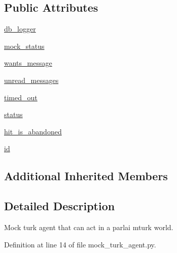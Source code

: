 \subsection*{Public Attributes}
\begin{DoxyCompactItemize}
\item 
\hyperlink{classparlai_1_1mturk_1_1webapp_1_1run__mocks_1_1mock__turk__agent_1_1MockTurkAgent_af5b22167ce7c695856bd9dac6c0fdd4f}{db\+\_\+logger}
\item 
\hyperlink{classparlai_1_1mturk_1_1webapp_1_1run__mocks_1_1mock__turk__agent_1_1MockTurkAgent_a7611391e84274d3980db9d567db13ae9}{mock\+\_\+status}
\item 
\hyperlink{classparlai_1_1mturk_1_1webapp_1_1run__mocks_1_1mock__turk__agent_1_1MockTurkAgent_a9aefbba229f0b0df3d267cad88df15e5}{wants\+\_\+message}
\item 
\hyperlink{classparlai_1_1mturk_1_1webapp_1_1run__mocks_1_1mock__turk__agent_1_1MockTurkAgent_afd7b0a0daee5029fa5ceb102d2f809f2}{unread\+\_\+messages}
\item 
\hyperlink{classparlai_1_1mturk_1_1webapp_1_1run__mocks_1_1mock__turk__agent_1_1MockTurkAgent_a428a987df6d32cfbdc591bec133b66ee}{timed\+\_\+out}
\item 
\hyperlink{classparlai_1_1mturk_1_1webapp_1_1run__mocks_1_1mock__turk__agent_1_1MockTurkAgent_ae796b9f8111dc43c24bc5e564e0dccbb}{status}
\item 
\hyperlink{classparlai_1_1mturk_1_1webapp_1_1run__mocks_1_1mock__turk__agent_1_1MockTurkAgent_ae12cfc5dc9bf903588e2bb5f9989ede4}{hit\+\_\+is\+\_\+abandoned}
\item 
\hyperlink{classparlai_1_1mturk_1_1webapp_1_1run__mocks_1_1mock__turk__agent_1_1MockTurkAgent_a1a099ffc00a93cdf9e8bd4b559737951}{id}
\end{DoxyCompactItemize}
\subsection*{Additional Inherited Members}


\subsection{Detailed Description}
\begin{DoxyVerb}Mock turk agent that can act in a parlai mturk world.
\end{DoxyVerb}
 

Definition at line 14 of file mock\+\_\+turk\+\_\+agent.\+py.



